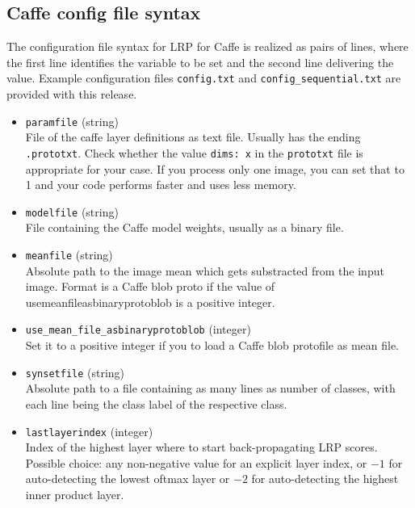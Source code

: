 \documentclass[a4wide]{article}
\begin{document}
\subsection*{Caffe config file syntax}

The configuration file syntax for LRP for Caffe is realized as pairs of lines, where the first line identifies the variable to be set and the second line delivering the value. Example configuration files \texttt{config.txt} and \texttt{config\_sequential.txt} are provided with this release.

\begin{itemize}
	\item \texttt{param\textunderscore file} (string) \\
File of the caffe layer definitions as text file. Usually has the ending \texttt{.prototxt}. Check whether the value  \texttt{dims: x} in the \texttt{prototxt} file is appropriate for your case. If you process only one image, you can set that to 1 and your code performs faster and uses less memory.

	\item \texttt{model\textunderscore file} (string) \\
	File containing the Caffe model weights, usually as a binary file.

	\item \texttt{mean\textunderscore file} (string) \\
Absolute path to the image mean which gets substracted from the input image. Format is a Caffe blob proto if the value of use\textunderscore mean\textunderscore file\textunderscore asbinaryprotoblob is a positive integer.

	\item \texttt{use\_mean\_file\_asbinaryprotoblob} (integer) \\
	Set it to a positive integer if you to load a Caffe blob protofile as mean file.

	\item \texttt{synsetfile} (string) \\
Absolute path to a file containing as many lines as number of classes, with each line being the class label of the respective class.

\item \texttt{lastlayerindex} (integer) \\
Index of the highest layer where to start back-propagating LRP scores. Possible choice: any non-negative value for an explicit layer index, or $-1$ for auto-detecting the lowest oftmax layer or $-2$ for auto-detecting the highest inner product layer.


\end{itemize}
\end{document}
